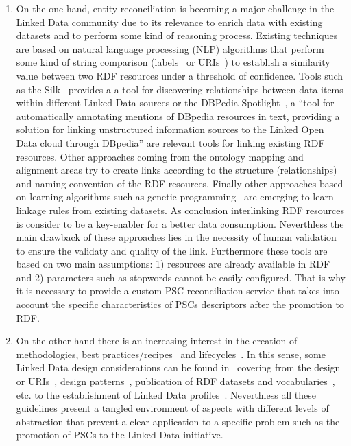  \begin{enumerate}
  \item  On the one hand, entity reconciliation is becoming a major challenge in the Linked Data community due to its relevance 
 to enrich data with existing datasets and to perform some kind of reasoning process. Existing techniques are based 
 on natural language processing (NLP) algorithms that perform some kind of string comparison (labels~\cite{Serimi} or URIs~\cite{Maali_Cyganiak_2011}) 
 to establish a similarity value between two RDF resources under a threshold of confidence. Tools such as the Silk~\cite{DBLP:conf/semweb/JentzschIB10} provides a 
 a tool for discovering relationships between data items within different Linked Data sources or the DBPedia Spotlight~\cite{DBLP:conf/i-semantics/MendesJGB11}, a 
 ``tool for automatically annotating mentions of DBpedia resources in text, providing a solution for linking unstructured information sources to the Linked Open Data 
 cloud through DBpedia'' are relevant tools for linking existing RDF resources. Other approaches coming from the ontology mapping and alignment areas try to create 
 links according to the structure (relationships) and naming convention of the RDF resources. Finally other approaches based on learning algorithms such as 
 genetic programming~\cite{DBLP:conf/semweb/IseleB11} are emerging to learn linkage rules from existing datasets. As conclusion interlinking RDF resources is 
 consider to be a key-enabler for a better data consumption. Neverthless the main drawback of these approaches lies in the necessity of human validation 
 to ensure the validaty and quality of the link. Furthermore these tools are based on two main assumptions: 1) resources are already available in RDF and 
 2) parameters such as stopwords cannot be easily configured. That is why it is necessary to provide a custom PSC reconciliation service that takes into account 
 the specific characteristics of PSCs descriptors after the promotion to RDF.
 
 \item On the other hand there is an increasing interest in the creation of methodologies, best practices/recipes~\cite{best-gld,linked-data-cookbook} and lifecycles~\cite{gld-lifecycle,lod2-stack}. In this sense, some 
 Linked Data design considerations can be found in~\cite{bizer07how} covering from the design or URIs~\cite{Sauermann+2007a,bernerslee1998uri,uris-uk}, design patterns~\cite{linked-data-patterns}, 
 publication of RDF datasets and vocabularies~\cite{Berr08}, etc. to the establishment of Linked Data profiles~\cite{basic-profile-w3c}. Neverthless all these guidelines present 
 a tangled environment of aspects with different levels of abstraction that prevent a clear application to a specific problem such as the promotion of PSCs to the Linked Data initiative.
 

\end{enumerate}
